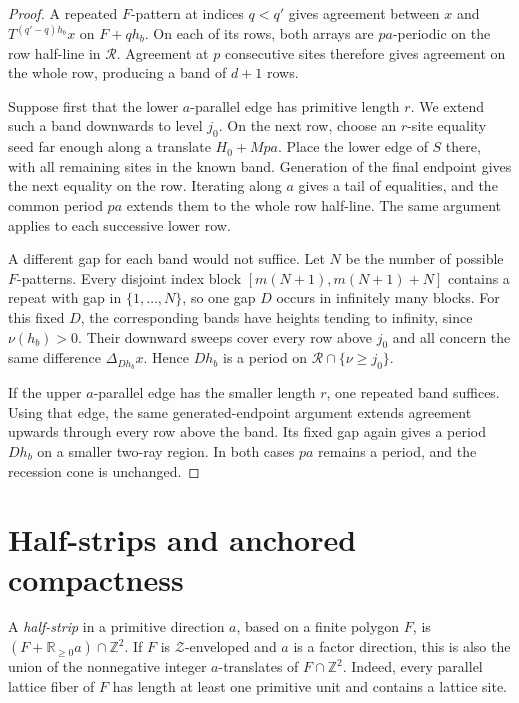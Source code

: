 \documentclass[11pt]{article}
\numberwithin{equation}{section}
\theoremstyle{definition}
\theoremstyle{remark}
\newcommand{\Z}{\mathbb Z}
\newcommand{\R}{\mathbb R}
\newcommand{\Del}[1]{\Delta_{#1}}
\newcommand{\ZZ}{\mathcal Z}
\newcommand{\RR}{\mathcal R}
\begin{document}
\begin{proof}
A repeated $F$-pattern at indices $q<q'$ gives agreement between $x$ and $T^{(q'-q)h_b}x$ on
$F+qh_b$. On each of its rows, both arrays are $pa$-periodic on the row half-line in $\RR$.
Agreement at $p$ consecutive sites therefore gives agreement on the whole row, producing a band of
$d+1$ rows.

Suppose first that the lower $a$-parallel edge has primitive length $r$. We extend such a band
downwards to level $j_0$. On the next row, choose an $r$-site equality seed far enough along a
translate $H_0+Mpa$. Place the lower edge of $S$ there, with all remaining sites in the known band.
Generation of the final endpoint gives the next equality on the row. Iterating along $a$ gives a
tail of equalities, and the common period $pa$ extends them to the whole row half-line. The same
argument applies to each successive lower row.

A different gap for each band would not suffice. Let $N$ be the number of possible $F$-patterns.
Every disjoint index block $[m(N+1),m(N+1)+N]$ contains a repeat with gap in $\{1,\ldots,N\}$, so
one gap $D$ occurs in infinitely many blocks. For this fixed $D$, the corresponding bands have
heights tending to infinity, since $\nu(h_b)>0$. Their downward sweeps cover every row above $j_0$
and all concern the same difference $\Del{Dh_b}x$. Hence $Dh_b$ is a period on
$\RR\cap\{\nu\ge j_0\}$.

If the upper $a$-parallel edge has the smaller length $r$, one repeated band suffices. Using that
edge, the same generated-endpoint argument extends agreement upwards through every row above the
band. Its fixed gap again gives a period $Dh_b$ on a smaller two-ray region. In both cases $pa$
remains a period, and the recession cone is unchanged.
\end{proof}

\section{Half-strips and anchored compactness}\label{sec:compactness}
A \emph{half-strip} in a primitive direction $a$, based on a finite polygon $F$, is
$(F+\R_{\ge0}a)\cap\Z^2$. If $F$ is $\ZZ$-enveloped and $a$ is a factor direction, this is also the
union of the nonnegative integer $a$-translates of $F\cap\Z^2$. Indeed, every parallel lattice fiber
of $F$ has length at least one primitive unit and contains a lattice site.
\end{document}
